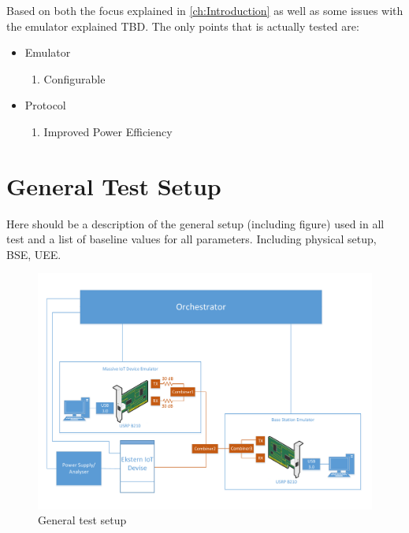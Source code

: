 Based on both the focus explained in \autoref{ch:Introduction} as well as some issues with the emulator explained TBD. The only points that is actually tested are:

\begin{itemize}
\item Emulator
	\begin{enumerate}
	\item Configurable %
	\end{enumerate}
\item Protocol
	\begin{enumerate}[resume]
	\item Improved Power Efficiency
	\end{enumerate}
\end{itemize}

\section{General Test Setup}
Here should be a description of the general setup (including figure) used in all test and a list of baseline values for all parameters. Including physical setup, BSE, UEE.

\begin{figure}[H]
\centering
\includegraphics[width=\textwidth]{figures/General_test_setup.pdf}
\caption{General test setup}
\label{fig:General_test_setup}
\end{figure}

